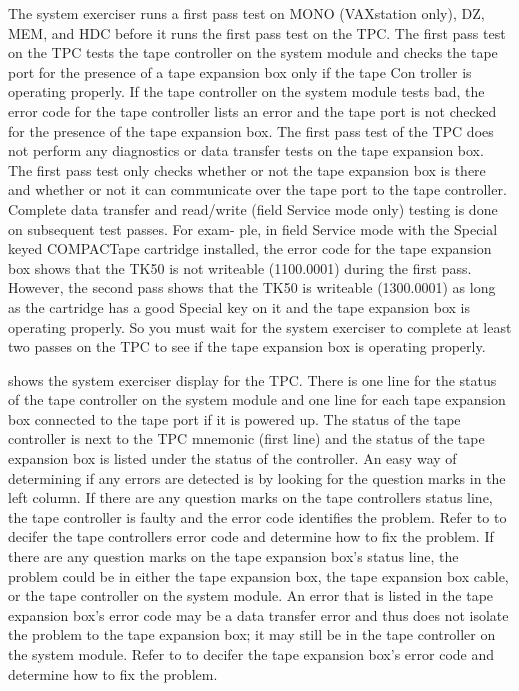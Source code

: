 The system exerciser runs a first pass test on MONO (VAXstation only), DZ,
MEM, and HDC before it runs the first pass test on the TPC. The first pass
test on the TPC tests the tape controller on the system module and checks
the tape port for the presence of a tape expansion box only if the tape Con
troller is operating properly. If the tape controller on the system module
tests bad, the error code for the tape controller lists an error and the tape
port is not checked for the presence of the tape expansion box. The first
pass test of the TPC does not perform any diagnostics or data transfer tests
on the tape expansion box. The first pass test only checks whether or not the
tape expansion box is there and whether or not it can communicate over the
tape port to the tape controller. Complete data transfer and read/write (field
Service mode only) testing is done on subsequent test passes. For exam-
ple, in field Service mode with the Special keyed COMPACTape cartridge
installed, the error code for the tape expansion box shows that the TK50 is
not writeable (1100.0001) during the first pass. However, the second pass
shows that the TK50 is writeable (1300.0001) as long as the cartridge has a
good Special key on it and the tape expansion box is operating properly.
So you must wait for the system exerciser to complete at least two passes
on the TPC to see if the tape expansion box is operating properly.

 shows the system exerciser display for the TPC. There is one
line for the status of the tape controller on the system module and one line
for each tape expansion box connected to the tape port if it is powered
up. The status of the tape controller is next to the TPC mnemonic (first
line) and the status of the tape expansion box is listed under the status of
the controller. An easy way of determining if any errors are detected is by
looking for the question marks in the left column. If there are any question
marks on the tape controllers status line, the tape controller is faulty and
the error code identifies the problem. Refer to  to decifer the tape
controllers error code and determine how to fix the problem. If there are
any question marks on the tape expansion box's status line, the problem
could be in either the tape expansion box, the tape expansion box cable, or
the tape controller on the system module. An error that is listed in the tape
expansion box's error code may be a data transfer error and thus does not
isolate the problem to the tape expansion box; it may still be in the tape
controller on the system module. Refer to  to decifer the tape
expansion box's error code and determine how to fix the problem.

